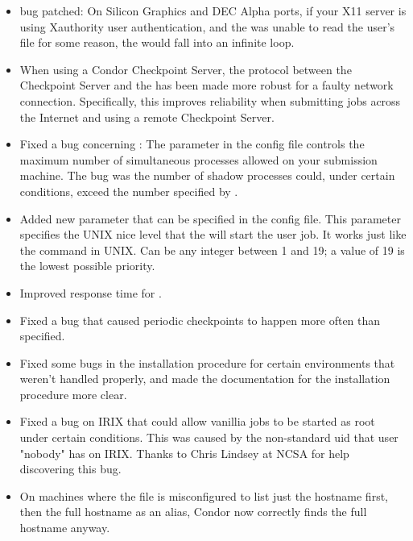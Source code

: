 \begin{itemize}

\item {} bug patched: On Silicon Graphics and DEC Alpha
ports, if your X11 server is using Xauthority user authentication, and
the  was unable to read the user's 
file for some reason, the  would fall into an infinite 
loop.

\item When using a Condor Checkpoint Server, the protocol between the
Checkpoint Server and the  has been made more robust
for a faulty network connection. Specifically, this improves
reliability when submitting jobs across the Internet and using a
remote Checkpoint Server.

\item Fixed a bug concerning : The parameter
 in the config file controls the maximum
number of simultaneous  processes allowed on your
submission machine.
The bug was the number of shadow processes could, under certain
conditions, exceed the number specified by
. 

\item Added new parameter  that can be
specified in the config file.
This parameter specifies the UNIX nice level that the 
will start the user job.
It works just like the  command in UNIX. 
Can be any integer between 1 and 19; a value of 19 is the lowest
possible priority.

\item Improved response time for .

\item Fixed a bug that caused periodic checkpoints to happen more
often than specified.

\item Fixed some bugs in the installation procedure for certain
environments that weren't handled properly, and made the documentation
for the installation procedure more clear.

\item Fixed a bug on IRIX that could allow vanillia jobs to be started
as root under certain conditions.
This was caused by the non-standard uid that user "nobody" has on
IRIX.
Thanks to Chris Lindsey at NCSA for help discovering this bug.

\item On machines where the  file is misconfigured to
list just the hostname first, then the full hostname as an alias,
Condor now correctly finds the full hostname anyway.


\end{itemize}
